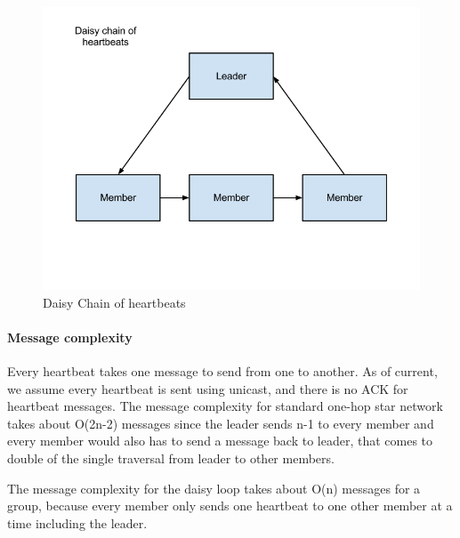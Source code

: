 \begin{figure}[h!]
\label{fig:daisy-chain}
\caption{Daisy Chain of heartbeats}
\centering
    \includegraphics[width=\linewidth]{figures/daisy-chain}
\end{figure}



\paragraph{Message complexity}

Every heartbeat takes one message to send from one to another. As of current,
      we assume every heartbeat is sent using unicast, and there is no ACK for
      heartbeat messages. The message complexity for standard one-hop star
      network takes about
      O(2n-2) messages since the leader sends n-1 to every member and every
      member would also has to send a message back to leader, that comes to
      double of the single traversal from leader to other members.

The message complexity for the daisy loop takes about O(n) messages for a group, because every member only sends one heartbeat to one other member at a time including the leader.

